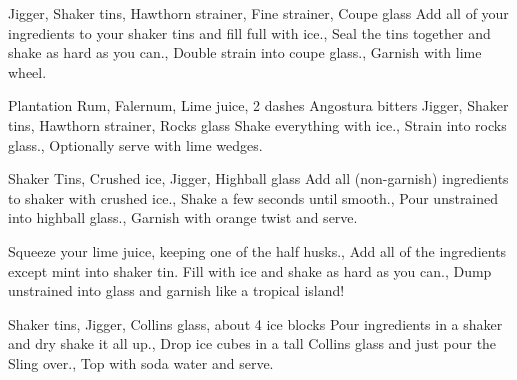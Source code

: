 \documentclass[../main.tex]{subfiles}
\begin{document}


%
{Jigger, Shaker tins, Hawthorn strainer, Fine strainer, Coupe glass}
%
{
	Add all of your ingredients to your shaker tins and fill full with ice.,
	Seal the tins together and shake as hard as you can.,
	Double strain into coupe glass.,
	{Garnish with lime wheel.}
}

\cocktailDivider

{
     Plantation Rum,
     Falernum,
     Lime juice,
    2 dashes Angostura bitters
}
{Jigger, Shaker tins, Hawthorn strainer, Rocks glass}
{
    Shake everything with ice.,
    Strain into rocks glass.,
    Optionally serve with lime wedges.
}

\cocktailDivider

{Shaker Tins, Crushed ice, Jigger, Highball glass}
{
    Add all (non-garnish) ingredients to shaker with crushed ice.,
    Shake a few seconds until smooth.,
    Pour unstrained into highball glass.,
    Garnish with orange twist and serve.
}

\cocktailDivider

{}
{
        {Squeeze your lime juice, keeping one of the half husks.},
        {Add all of the ingredients except mint into shaker tin. Fill with ice and shake as hard as you can.},
        {Dump unstrained into glass and garnish like a tropical island!}
}

\newpage

{Shaker tins, Jigger, Collins glass, about 4 ice blocks}
{
    {Pour ingredients in a shaker and dry shake it all up.},
    {Drop ice cubes in a tall Collins glass and just pour the Sling over.},
    {Top with soda water and serve.}
}
\end{document}
